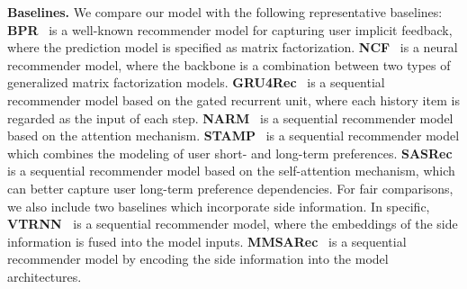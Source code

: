 \documentclass[conference]{IEEEtran}
\theoremstyle{definition}
\theoremstyle{theorem}
\theoremstyle{proof}
\theoremstyle{remark}
\begin{document}
\begin{table}[t]
	\centering
	\caption{{Statistics of the datasets, where the prefix ``Amazon-'' is omitted, and ``SeqLen'' is the average sequence length per user.}}
	\vspace{-0.cm}
	\renewcommand\arraystretch{1.2}
	\label{rec-dataset}
	\vspace{-0.cm}
\end{table}


\noindent
\textbf{Baselines.}
We compare our model with the following representative baselines:
\textbf{BPR}~\cite{BPR} is a {well-known} recommender model for capturing user implicit feedback, where the prediction model is specified as matrix factorization.
\textbf{NCF}~\cite{ncf} is a neural recommender model, where the backbone is a combination between two types of generalized matrix factorization models.
\textbf{GRU4Rec}~\cite{hidasi2015session} is a sequential recommender model based on the gated recurrent unit, where each history item is regarded as the input of each step.
\textbf{NARM}~\cite{li2017neural} is a sequential recommender model based on the attention mechanism.
\textbf{STAMP}~\cite{liu2018stamp} is a sequential recommender model which combines the modeling of user short- and long-term preferences.
\textbf{SASRec}~\cite{SASRec} is a sequential recommender model based on the self-attention mechanism, which can better capture user long-term preference dependencies.
For fair comparisons, we also include two baselines which incorporate side information.
In specific, 
{\textbf{VTRNN~\cite{cui2016visual}} is a sequential recommender model, where the embeddings of the side information is fused into the model inputs.}
{\textbf{MMSARec}~\cite{han2020sequential} is a sequential recommender model by encoding the side information into the model architectures.}
\end{document}

